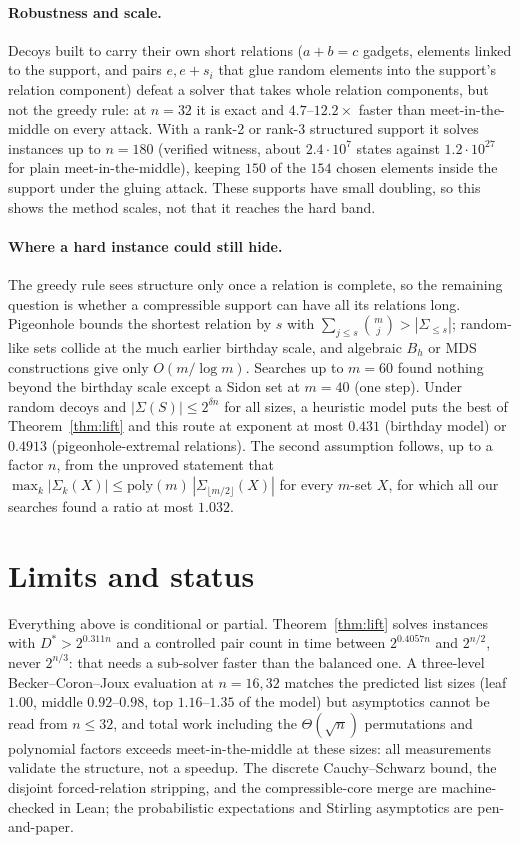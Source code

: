\documentclass[conference]{IEEEtran}
\begin{document}
\paragraph*{Robustness and scale.}
Decoys built to carry their own short relations ($a+b=c$ gadgets, elements linked to the
support, and pairs $e,e+s_i$ that glue random elements into the support's relation component)
defeat a solver that takes whole relation components, but not the greedy rule: at $n=32$ it
is exact and $4.7$--$12.2\times$ faster than meet-in-the-middle on every attack. With a rank-2
or rank-3 structured support it solves instances up to $n=180$ (verified witness, about
$2.4\cdot10^7$ states against $1.2\cdot10^{27}$ for plain meet-in-the-middle), keeping
$150$ of the $154$ chosen elements inside the support under the gluing attack. These supports
have small doubling, so this shows the method scales, not that it reaches the hard band.

\paragraph*{Where a hard instance could still hide.}
The greedy rule sees structure only once a relation is complete, so the remaining question is
whether a compressible support can have all its relations long. Pigeonhole bounds the shortest
relation by $s$ with $\sum_{j\le s}\binom mj>|\Sigma_{\le s}|$; random-like sets collide at the
much earlier birthday scale, and algebraic $B_h$ or MDS constructions give only $O(m/\log m)$.
Searches up to $m=60$ found nothing beyond the birthday scale except a Sidon set at $m=40$ (one
step). Under random decoys and $|\Sigma(S)|\le 2^{\delta n}$ for all sizes, a heuristic model
puts the best of Theorem~\ref{thm:lift} and this route at exponent at most $0.431$ (birthday
model) or $0.4913$ (pigeonhole-extremal relations). The second assumption follows, up to a
factor $n$, from the unproved statement that $\max_k|\Sigma_k(X)|\le\mathrm{poly}(m)\,
|\Sigma_{\lfloor m/2\rfloor}(X)|$ for every $m$-set $X$, for which all our searches found a
ratio at most $1.032$.

\section{Limits and status}
Everything above is conditional or partial. Theorem~\ref{thm:lift} solves instances with
$D^*>2^{0.311n}$ and a controlled pair count in time between $2^{0.4057n}$ and
$2^{n/2}$, never $2^{n/3}$: that needs a sub-solver faster than the balanced one.
A three-level Becker--Coron--Joux evaluation at $n=16,32$ matches the predicted list
sizes (leaf $1.00$, middle $0.92$--$0.98$, top $1.16$--$1.35$ of the model) but
asymptotics cannot be read from $n\le32$, and total work including the
$\Theta(\sqrt n)$ permutations and polynomial factors exceeds
meet-in-the-middle at these sizes: all measurements validate the structure, not a
speedup. The discrete Cauchy--Schwarz bound, the disjoint forced-relation stripping,
and the compressible-core merge are machine-checked in Lean; the probabilistic
expectations and Stirling asymptotics are pen-and-paper.
\end{document}
